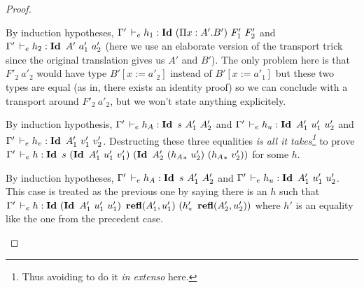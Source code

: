 \documentclass[a4paper,english]{lipics-utf8x}
\begin{document}
\begin{proof}
\begin{caselist}
      \begin{graycase}
        \begin{mathc}
        \end{mathc}
        By induction hypotheses,
        $\Gamma' \,\vdash_e h_1 : \operatorname{\mathbf{Id}~} (\Pi x:A'.B')\ F'_1\ F'_2$ and
        $\Gamma' \,\vdash_e h_2 : \operatorname{\mathbf{Id}~} A'\ a'_1\ a'_2$ (here we use an elaborate
        version of the transport trick since the original translation gives us
        $A'$ and $B'$).
        The only problem here is that $F'_2\ a'_2$ would have type
        $B'[x := a'_2]$ instead of $B'[x := a'_1]$ but these two types are equal
        (as in, there exists an identity proof) so we can conclude with a
        transport around $F'_2\ a'_2$, but we won't state anything explicitely.
      \end{graycase}

      \begin{graycase}
        \begin{mathc}
        \end{mathc}
        By induction hypothesis, $\Gamma' \,\vdash_e h_A : \operatorname{\mathbf{Id}~} s\ A'_1\ A'_2$
        and $\Gamma' \,\vdash_e h_u : \operatorname{\mathbf{Id}~} A'_1\ u'_1\ u'_2$ and
        $\Gamma' \,\vdash_e h_v : \operatorname{\mathbf{Id}~} A'_1\ v'_1\ v'_2$.
        Destructing these three equalities \emph{is all it takes\footnote{Thus
        avoiding to do it \emph{in extenso} here.}} to prove
        $\Gamma' \dere h : \Id s\ (\Id A'_1\ u'_1\ v'_1)\ %
        (\Id A'_2\ ({h_A}_*\ u'_2)\ ({h_A}_*\ v'_2))$ for some $h$.
      \end{graycase}

      \begin{graycase}
        \begin{mathc}
        \end{mathc}
        By induction hypotheses, $\Gamma' \,\vdash_e h_A : \operatorname{\mathbf{Id}~} s\ A'_1\ A'_2$
        and $\Gamma' \,\vdash_e h_u : \operatorname{\mathbf{Id}~} A'_1\ u'_1\ u'_2$.
        This case is treated as the previous one by saying there is an $h$
        such that $\Gamma' \dere h : \Id (\Id A'_1\ u'_1\ u'_1)\ %
        \refl(A'_1,u'_1)\ (h'_*\ \refl(A'_2,u'_2))$ where $h'$ is an equality
        like the one from the precedent case.
      \end{graycase}


\end{caselist}
\end{proof}
\end{document}

